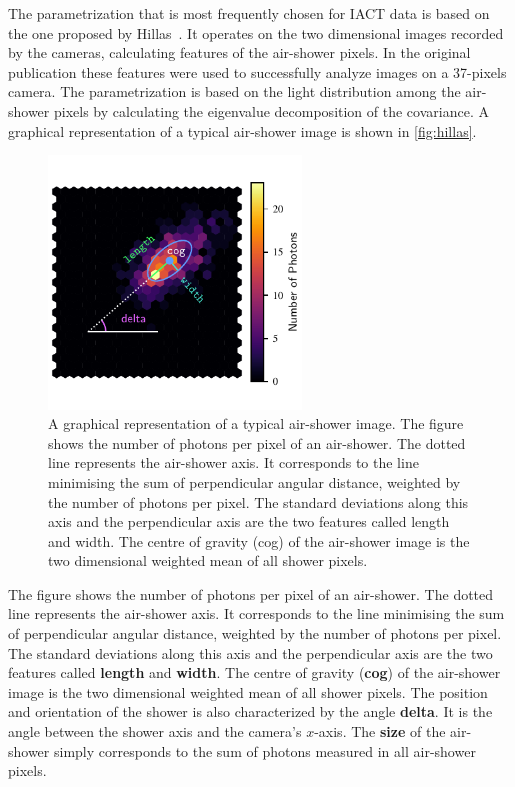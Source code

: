 The parametrization that is most frequently chosen for IACT data is based on
the one proposed by Hillas~\cite{Hillas}. It operates on the two dimensional
images recorded by the cameras, calculating features of the air-shower pixels.
In the original publication these features were used to successfully analyze
images on a 37-pixels camera. The parametrization is based on the light
distribution among the air-shower pixels by calculating the eigenvalue
decomposition of the covariance. A graphical representation of a typical
air-shower image is shown in \autoref{fig:hillas}.
%
\begin{figure}
  \centering%
  \includegraphics[width=0.6\textwidth]{Plots/hillas.pdf}%
  \caption{A graphical representation of a typical air-shower image. The figure shows the number of photons per pixel of an air-shower. The dotted
  line represents the air-shower axis. It corresponds to the line minimising the
  sum of perpendicular angular distance, weighted by the number of photons per
  pixel. The standard deviations along this axis and the perpendicular axis are
  the two features called length and width. The centre of
  gravity (cog) of the air-shower image is the two dimensional weighted
  mean of all shower pixels.}%
  \label{fig:hillas}%
\end{figure}
%
The figure shows the number of photons per pixel of an air-shower. The dotted
line represents the air-shower axis. It corresponds to the line minimising the
sum of perpendicular angular distance, weighted by the number of photons per
pixel. The standard deviations along this axis and the perpendicular axis are
the two features called \textbf{length} and \textbf{width}. The centre of
gravity (\textbf{cog}) of the air-shower image is the two dimensional weighted
mean of all shower pixels. The position and orientation of the shower is also
characterized by the angle \textbf{delta}. It is the angle between the shower
axis and the camera's $x$-axis. The \textbf{size} of the air-shower simply
corresponds to the sum of photons measured in all air-shower pixels.


